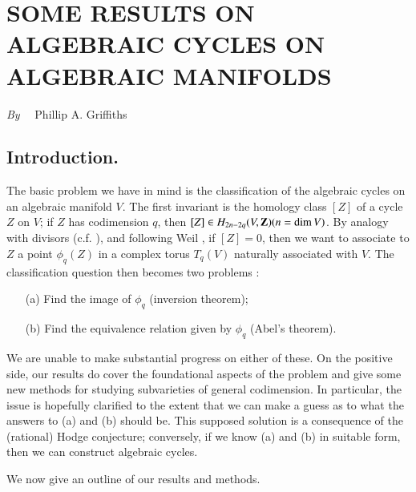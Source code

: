 \chapter[\textsc{P. A. Griffiths~:} Some Results on Algebraic Cycles on Algebraic Manifolds]{SOME RESULTS ON ALGEBRAIC CYCLES ON ALGEBRAIC MANIFOLDS}\label{art08}

\begin{center}
{\em By}~~ Phillip A. Griffiths
\end{center}

\setcounter{pageoriginal}{92}
\setcounter{section}{-1}
\section{Introduction.}\label{art08-sec0}\pageoriginale


The basic problem we have in mind is the classification of the algebraic cycles on an algebraic manifold $V$. The first invariant is the homology class $[Z]$ of a cycle $Z$ on $V$; if $Z$ has codimension $q$, then $[Z]\in H_{2n-2q}(V,\mathbf{Z})(n=\dim V)$. By analogy with divisors (c.f. \cite{art08-key18}), and following Weil \cite{art08-key22}, if $[Z]=0$, then we want to associate to $Z$ a point $\phi_{q}(Z)$ in a complex torus $T_{q}(V)$ naturally associated with $V$. The classification question then becomes two problems :
\begin{itemize}
\item[(a)] Find the image of $\phi_{q}$ (inversion theorem);

\item[(b)] Find the equivalence relation given by $\phi_{q}$ (Abel's theorem).
\end{itemize}

We are unable to make substantial progress on either of these. On the positive side, our results do cover the foundational aspects of the problem and give some new methods for studying subvarieties of general codimension. In particular, the issue is hopefully clarified to the extent that we can make a guess as to what the answers to (a) and (b) should be. This supposed solution is a consequence of the (rational) Hodge conjecture; conversely, if we know (a) and (b) in suitable form, then we can construct algebraic cycles.

We now give an outline of our results and methods.

